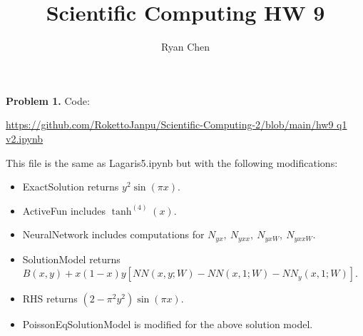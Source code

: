 \documentclass{article}
\title{Scientific Computing HW 9}
\author{Ryan Chen}
\def\tbf#1{\textbf{#1}}
\begin{document}
	
\maketitle



\tbf{Problem 1.} Code:

\url{https://github.com/RokettoJanpu/Scientific-Computing-2/blob/main/hw9 q1 v2.ipynb}

This file is the same as Lagaris5.ipynb but with the following modifications:

\begin{itemize}
	\item ExactSolution returns $y^2\sin(\pi x)$.
	\item ActiveFun includes $\tanh^{(4)}(x)$.
	\item NeuralNetwork includes computations for $N_{yx},~N_{yxx},~N_{yxW},~N_{yxxW}$.
	\item SolutionModel returns $B(x,y) + x(1-x)y[NN(x,y;W)-NN(x,1;W)-NN_y(x,1;W)]$.
	\item RHS returns $(2-\pi^2y^2)\sin(\pi x)$.
	\item PoissonEqSolutionModel is modified for the above solution model.
\end{itemize}
\end{document}
